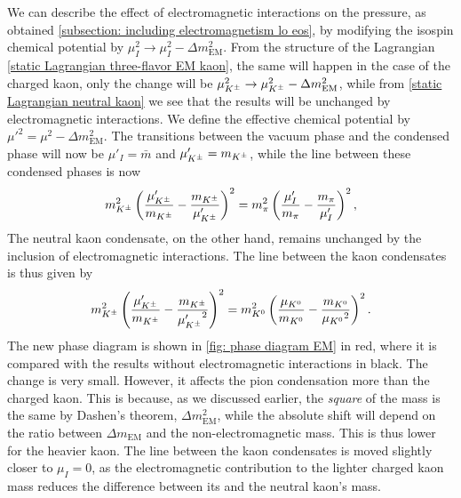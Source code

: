 We can describe the effect of electromagnetic interactions on the pressure, as obtained \autoref{subsection: including electromagnetism lo eos}, by modifying the isospin chemical potential by $\mu^2_I \rightarrow \mu^2_I - \Delta m_\text{EM}^2$.
From the structure of the Lagrangian \autoref{static Lagrangian three-flavor EM kaon}, the same will happen in the case of the charged kaon, only the change will be $\mu^2_{K^\pm} \rightarrow \mu^2_{K^\pm} - \Delta m_\text{EM}^2$, while from \autoref{static Lagrangian neutral kaon} we see that the results will be unchanged by electromagnetic interactions.
We define the effective chemical potential by ${\mu'}^2 = \mu^2 - \Delta m_\text{EM}^2$.
The transitions between the vacuum phase and the condensed phase will now be $\mu'_I = \bar m$ and $\mu_{K^\pm}' = m_{K^\pm}$, while the line between these condensed phases is now
%
\begin{equation}
    m_{K^\pm}^2
    \left(
         \frac{{\mu_{K^\pm}'}}{m_{K^\pm}}
         - \frac{m_{K^\pm}}{{\mu_{K^\pm}'}} 
        \right)^2
    =
    m_\pi^2  
    \left( 
        \frac{{\mu_I'}}{m_\pi}
        - \frac{m_\pi}{{\mu_I'}}
    \right)^2,
\end{equation}
%
The neutral kaon condensate, on the other hand, remains unchanged by the inclusion of electromagnetic interactions.
The line between the kaon condensates is thus given by
%
\begin{equation}
    m_{K^\pm}^2
    \left(
         \frac{{\mu_{K^\pm}'}}{m_{K^\pm}}
         - \frac{m_{K^\pm}}{{\mu_{K^\pm}'}^2} 
        \right)^2
    =
    m_{K^0}^2  
    \left( 
        \frac{{\mu_{K^0}}}{m_{K^0}}
        - \frac{m_{K^0}}{{\mu_{K^0}}^2}  
    \right)^2.
\end{equation}
%
The new phase diagram is shown in \autoref{fig: phase diagram EM} in red, where it is compared with the results without electromagnetic interactions in black.
The change is very small. 
However, it affects the pion condensation more than the charged kaon.
This is because, as we discussed earlier, the \emph{square} of the mass is the same by Dashen's theorem, $\Delta m_\text{EM}^2$, while the absolute shift will depend on the ratio between $\Delta m_\text{EM}$ and the non-electromagnetic mass.
This is thus lower for the heavier kaon.
The line between the kaon condensates is moved slightly closer to $\mu_I = 0$, as the electromagnetic contribution to the lighter charged kaon mass reduces the difference between its and the neutral kaon's mass.

